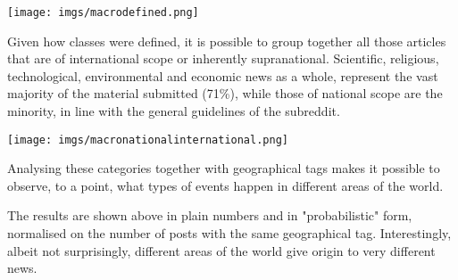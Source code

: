 \documentclass{article}
\begin{document}
\bigskip

\texttt{[image: imgs/macrodefined.png]}

Given how classes were defined, it is possible to group together all those articles that are of international scope or inherently supranational.
Scientific, religious, technological, environmental and economic news as a whole, represent the vast majority of the material submitted (71\%), while those of national scope are the minority, in line with the general guidelines of the subreddit.

\bigskip

\texttt{[image: imgs/macronationalinternational.png]}

Analysing these categories together with geographical tags makes it possible to observe, to a point, what types of events happen in different areas of the world. 

\bigskip


\bigskip


\bigskip

The results are shown above in plain numbers and in "probabilistic" form, normalised on the number of posts with the same geographical tag. Interestingly, albeit not surprisingly, different areas of the world give origin to very different news. 
\end{document}
